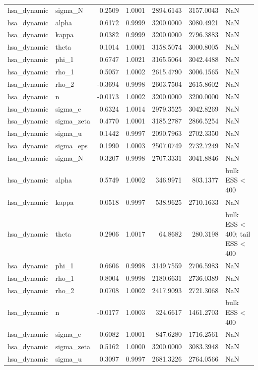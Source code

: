 \begin{tabular}{llrrrrl}
hsa\_dynamic & sigma\_N & 0.2509 & 1.0001 & 2894.6143 & 3157.0043 & NaN \\
hsa\_dynamic & alpha & 0.6172 & 0.9999 & 3200.0000 & 3080.4921 & NaN \\
hsa\_dynamic & kappa & 0.0382 & 0.9999 & 3200.0000 & 2796.3883 & NaN \\
hsa\_dynamic & theta & 0.1014 & 1.0001 & 3158.5074 & 3000.8005 & NaN \\
hsa\_dynamic & phi\_1 & 0.6747 & 1.0021 & 3165.5064 & 3042.4488 & NaN \\
hsa\_dynamic & rho\_1 & 0.5057 & 1.0002 & 2615.4790 & 3006.1565 & NaN \\
hsa\_dynamic & rho\_2 & -0.3694 & 0.9998 & 2603.7504 & 2615.8602 & NaN \\
hsa\_dynamic & n & -0.0173 & 1.0002 & 3200.0000 & 3200.0000 & NaN \\
hsa\_dynamic & sigma\_e & 0.6324 & 1.0014 & 2979.3525 & 3042.8269 & NaN \\
hsa\_dynamic & sigma\_zeta & 0.4770 & 1.0001 & 3185.2787 & 2866.5254 & NaN \\
hsa\_dynamic & sigma\_u & 0.1442 & 0.9997 & 2090.7963 & 2702.3350 & NaN \\
hsa\_dynamic & sigma\_eps & 0.1990 & 1.0003 & 2507.0749 & 2732.7249 & NaN \\
hsa\_dynamic & sigma\_N & 0.3207 & 0.9998 & 2707.3331 & 3041.8846 & NaN \\
hsa\_dynamic & alpha & 0.5749 & 1.0002 & 346.9971 & 803.1377 & bulk ESS < 400 \\
hsa\_dynamic & kappa & 0.0518 & 0.9997 & 538.9625 & 2710.1633 & NaN \\
hsa\_dynamic & theta & 0.2906 & 1.0017 & 64.8682 & 280.3198 & bulk ESS < 400; tail ESS < 400 \\
hsa\_dynamic & phi\_1 & 0.6606 & 0.9998 & 3149.7559 & 2706.5983 & NaN \\
hsa\_dynamic & rho\_1 & 0.8004 & 0.9998 & 2180.6631 & 2736.0389 & NaN \\
hsa\_dynamic & rho\_2 & 0.0708 & 1.0002 & 2417.9093 & 2721.3068 & NaN \\
hsa\_dynamic & n & -0.0177 & 1.0003 & 324.6617 & 1461.2703 & bulk ESS < 400 \\
hsa\_dynamic & sigma\_e & 0.6082 & 1.0001 & 847.6280 & 1716.2561 & NaN \\
hsa\_dynamic & sigma\_zeta & 0.5162 & 1.0000 & 3200.0000 & 3083.3948 & NaN \\
hsa\_dynamic & sigma\_u & 0.3097 & 0.9997 & 2681.3226 & 2764.0566 & NaN \\

\end{tabular}
